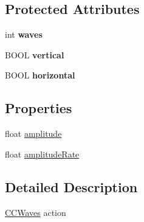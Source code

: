 \subsection*{Protected Attributes}
\begin{DoxyCompactItemize}
\item 
\hypertarget{interface_c_c_waves_ab63f8e32d53f8e501c33f372edfebfbf}{int {\bfseries waves}}\label{interface_c_c_waves_ab63f8e32d53f8e501c33f372edfebfbf}

\item 
\hypertarget{interface_c_c_waves_a20525778f52901a1e06edd26c8bc0dc3}{B\-O\-O\-L {\bfseries vertical}}\label{interface_c_c_waves_a20525778f52901a1e06edd26c8bc0dc3}

\item 
\hypertarget{interface_c_c_waves_a5e5e0789bec7299eb4be1faafe7ac7a3}{B\-O\-O\-L {\bfseries horizontal}}\label{interface_c_c_waves_a5e5e0789bec7299eb4be1faafe7ac7a3}

\end{DoxyCompactItemize}
\subsection*{Properties}
\begin{DoxyCompactItemize}
\item 
float \hyperlink{interface_c_c_waves_a7b04d8498cdedb3ee4bb4b1a3edfe2aa}{amplitude}
\item 
float \hyperlink{interface_c_c_waves_a86d4f9c57411c5b5e76a5d38b9435cb2}{amplitude\-Rate}
\end{DoxyCompactItemize}


\subsection{Detailed Description}
\hyperlink{interface_c_c_waves}{C\-C\-Waves} action 

